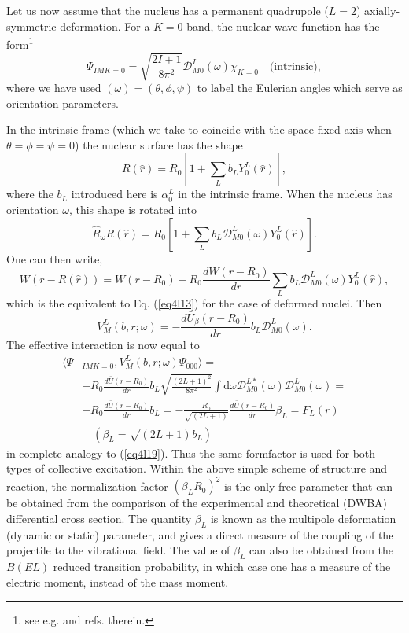 \begin{subappendices}
Let us  now assume that the nucleus has a permanent quadrupole ($L=2$) axially-symmetric deformation. For a $K=0$ band, the nuclear wave function has the form\footnote{see e.g. \cite{Bohr:75} and refs. therein.}
\begin{equation}\label{eq4l22}
\Psi_{I M K=0} = \sqrt{\frac{2I+1}{8\pi^2}} \mathcal{D}_{M0}^I(\omega) \chi_{K=0} \quad \text{(intrinsic)},
\end{equation}
where we have used $(\omega)=(\theta,\phi,\psi)$ to label the Eulerian angles which serve as orientation parameters.


In the intrinsic frame (which we take to coincide with the space-fixed axis when $\theta=\phi=\psi=0$) the nuclear surface has the shape
\begin{equation}\label{eq4l23}
R(\hat r)= R_0 \left[ 1+ \sum_L b_L  Y^L_0(\hat r)\right],
\end{equation}
where the $b_L$ introduced here is $\alpha_0^L$ in the intrinsic frame. When the nucleus has orientation $\omega$, this shape is rotated into
\begin{equation}\label{eq4l24}
\hat{R}_\omega R(\hat r)= R_0 \left[ 1+ \sum_L b_L \mathcal D_{M0}^L(\omega) Y^L_0(\hat r)\right].
\end{equation}
One can then write,
\begin{equation}\label{eq4l25}
W(r-R(\hat r))=W(r-R_0)-R_0\frac{d  W(r-R_0)}{d r}
\sum_L b_L \mathcal D_{M0}^L(\omega) Y^L_0(\hat r),
\end{equation}
which is the equivalent to Eq. (\ref{eq4l13}) for the case of deformed nuclei. Then
\begin{equation}
 V_M^L(b,r;\omega)=-\frac{d
\bar U_\beta (r-R_0)}{d r}b_L \mathcal D_{M0}^L(\omega).
\end{equation}
The effective interaction is now equal to
\begin{equation}
\begin{split}
 \langle  \Psi&_{I M K=0} , V_M^L(b,r;\omega) \Psi_{000}\rangle =\\
& -R_0\frac{d
\bar U (r-R_0)}{d r}b_L \sqrt{\frac{(2L+1)^2}{8\pi^2}} \int \mathrm{d} \omega \mathcal D_{M0}^{L*}(\omega)
\mathcal D_{M0}^L(\omega)=\\
& -R_0\frac{d
\bar U (r-R_0)}{d r}b_L=-\frac{R_0}{\sqrt{(2L+1)}}\frac{d
\bar U (r-R_0)}{d r}\beta_L=F_L(r)\\
& \quad (\beta_L=\sqrt{(2L+1)} b_L)
\end{split}
\end{equation}
in complete analogy to (\ref{eq4l19}). Thus the same formfactor is used for both types of collective excitation. Within the above simple scheme of structure and reaction, 
the normalization factor $(\beta_L R_0)^2$  is the only free parameter that can be obtained from the comparison of the experimental and theoretical (DWBA) differential cross section. The quantity $\beta_L$ is known as the multipole deformation (dynamic or static) parameter, and gives a direct measure of the coupling of the projectile to the vibrational field.
The value of $\beta_L$ can also be obtained from the $B(EL)$ reduced transition probability, in which case one has a measure of the electric moment, instead of the mass moment.

\end{subappendices}
